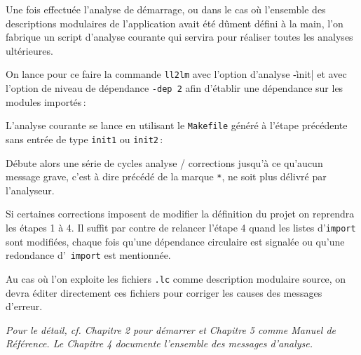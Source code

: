 
Une fois effectu\'{e}e l'analyse de d\'{e}marrage, ou dans le cas o\`{u}
l'ensemble des descriptions modulaires de l'application
avait \'{e}t\'{e} d\^{u}ment d\'{e}fini \`{a} la main, 
l'on fabrique un script d'analyse
courante qui servira pour r\'{e}aliser toutes les analyses ult\'{e}rieures.

On lance pour ce faire la commande {\tt ll2lm} avec l'option
d'analyse \|-init| et avec l'option de niveau de d\'{e}pendance
{\tt -dep 2} afin d'\'{e}tablir une d\'{e}pendance sur les modules 
import\'{e}s\,:

\begin{Code*}
\end{Code*}



L'analyse courante se lance en utilisant le {\tt Makefile}
g\'{e}n\'{e}r\'{e} \`{a} l'\'{e}tape pr\'{e}c\'{e}dente sans entr\'{e}e de type
{\tt init1} ou {\tt init2}\,:
\begin{Code*}
\end{Code*}

D\'{e}bute alors une s\'{e}rie de cycles analyse / corrections jusqu'\`{a}
ce qu'aucun message grave, c'est \`{a} dire pr\'{e}c\'{e}d\'{e} de la marque
{\tt **}, ne soit plus d\'{e}livr\'{e} par l'analyseur.

Si certaines corrections imposent de modifier la d\'{e}finition du projet
on reprendra les \'{e}tapes 1 \`{a} 4. Il suffit par contre de relancer l'\'{e}tape 4
quand les listes d'{\tt import} sont modifi\'{e}es, chaque fois qu'une
d\'{e}pendance circulaire est signal\'{e}e ou qu'une redondance d'{\tt
import} est mentionn\'{e}e.

Au cas o\`{u} l'on exploite les fichiers {\tt .lc} comme description
modulaire source, on devra \'{e}diter directement ces fichiers pour 
corriger les causes des messages d'erreur.

\medskip 

{\em Pour le d\'{e}tail, cf. Chapitre 2 pour d\'{e}marrer et Chapitre 5
comme Manuel de R\'{e}f\'{e}rence. Le Chapitre 4 documente l'ensemble des
messages d'analyse.}


